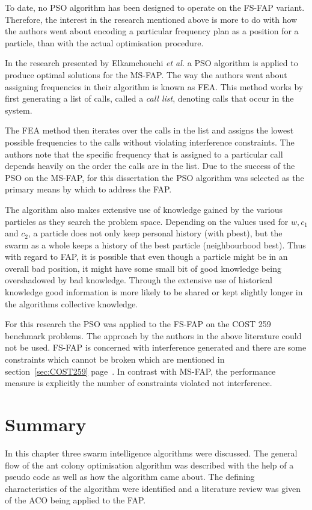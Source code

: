 To date, no \gls{PSO} algorithm has been designed to operate on the \gls{FS-FAP} variant. Therefore, the interest in the research mentioned above is more to do with how the authors went about encoding a particular frequency plan as a position for a particle, than with the actual optimisation procedure.

In the research presented by Elkamchouchi \emph{et al.}\cite{EgyptFAPPSO} a \gls{PSO} algorithm is applied to produce optimal solutions for the \gls{MS-FAP}. The way the authors went about assigning frequencies in their algorithm is known as \gls{FEA}.
This method works by first generating a list of calls, called a \emph{call list}, denoting calls that occur in the system\cite{EgyptFAPPSO}. 

The \gls{FEA} method then iterates over the calls in the list and assigns the lowest possible frequencies to the calls without violating interference constraints\cite{EgyptFAPPSO}. The authors note that the specific frequency that is assigned to a particular call depends heavily on the order the calls are in the list\cite{EgyptFAPPSO}.
Due to the success of the \gls{PSO} on the \gls{MS-FAP}, for this dissertation the \gls{PSO} algorithm was selected as the primary means by which to address the \gls{FAP}.

The algorithm also makes extensive use of knowledge gained by the various particles as they search the problem space. Depending on the values used for $w, c_1$ and $c_2$, a particle does not only keep personal history (with pbest), but the swarm as a whole keeps a history of the best particle (neighbourhood best). Thus with regard to \gls{FAP}, it is possible that even though a particle might be in an overall bad position, it might have some small bit of good knowledge being overshadowed by bad knowledge. Through the extensive use of historical knowledge good information is more likely to be shared or kept slightly longer in the algorithms collective knowledge.

For this research the \gls{PSO} was applied to the \gls{FS-FAP} on the \gls{COST} 259 benchmark problems. The approach by the authors in the above literature could not be used. \gls{FS-FAP} is concerned with interference generated and there are some constraints which cannot be broken which are mentioned in section~\ref{sec:COST259} page~\pageref{sec:COST259}. In contrast with \gls{MS-FAP}, the performance measure is explicitly the number of constraints violated not interference.

\section{Summary}
\label{sec:SISummary}
In this chapter three swarm intelligence algorithms were discussed. The general flow of the ant colony optimisation algorithm was described with the help of a pseudo code as well as how the algorithm came about. The defining characteristics of the algorithm were identified and a literature review was given of the \gls{ACO} being applied to the \gls{FAP}.

